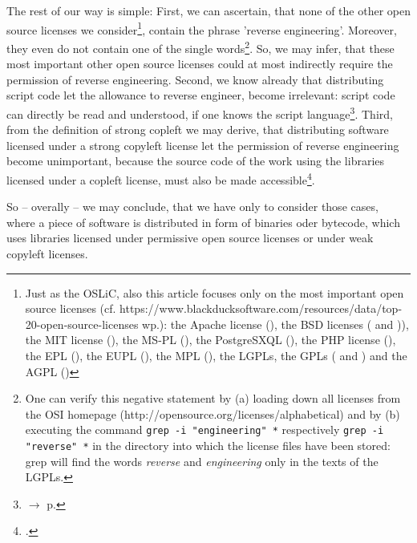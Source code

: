 The rest of our way is simple: First, we can ascertain, that none of the other
open source licenses we consider\footnote{\label{RevEngOsiLicenses}Just as the
OSLiC, also this article focuses only on the most important open source licenses (cf.
https://www.blackducksoftware.com/resources/data/top-20-open-source-licenses
wp.): the Apache license (\cite[cf.][\nopage wp.]{Apl20OsiLicense2004a}), the
BSD licenses (\cite[cf.][\nopage wp.]{BsdLicense3Clause} and \cite[cf.][\nopage
wp.]{BsdLicense2Clause})), the MIT license (\cite[cf.][\nopage
wp.]{MitLicense2012a}), the MS-PL (\cite[cf.][\nopage
wp.]{MsplOsiLicense2013a}), the PostgreSXQL (\cite[cf.][\nopage
wp.]{PglOsiLicense2013a}), the PHP license (\cite[cf.][\nopage
wp.]{Php30OsiLicense2013a}), the EPL (\cite[cf.][\nopage
wp.]{Epl10OsiLicense2005a}), the EUPL (\cite[cf.][\nopage
wp.]{Eupl11OsiLicense2007a}), the MPL (\cite[cf.][\nopage
wp.]{Mpl20OsiLicense2013a}), the LGPLs, the GPLs (\cite[cf.][\nopage
wp.]{Gpl20OsiLicense1991a} and \cite[cf.][\nopage wp.]{Gpl30OsiLicense2007a})
and the AGPL (\cite[cf.][\nopage wp.]{Agpl30OsiLicense2007a})}, contain the
phrase 'reverse engineering'. Moreover, they even do not contain one of the
single words\footnote{One can verify this negative statement by (a) loading down
all licenses from the OSI homepage (http://opensource.org/licenses/alphabetical)
and by (b) executing the command \texttt{grep -i "engineering" *} respectively
\texttt{grep -i "reverse" *} in the directory into which the license files have
been stored: grep will find the words \emph{reverse} and \emph{engineering} only
in the texts of the LGPLs.}. So, we may infer, that these most important other
open source licenses could at most indirectly require the permission of reverse
engineering. Second, we know already that distributing script code let the
allowance to reverse engineer, become irrelevant: script code can directly be
read and understood, if one knows the script language\footnote{$\rightarrow$ p. 
\pageref{RevEngDistributeScripts}}.
Third, from the definition of strong copleft we may derive, that distributing
software licensed under a strong copyleft license let the permission of reverse
engineering become unimportant, because the source code of the work using the
libraries licensed under a copleft license, must also be made
accessible\footcite[cf.][\nopage wp]{Stallman1996c}.

So -- overally -- we may conclude, that we have only to consider those cases,
where a piece of software is distributed in form of binaries oder bytecode,
which uses libraries licensed under permissive open source licenses or under 
weak copyleft licenses.


